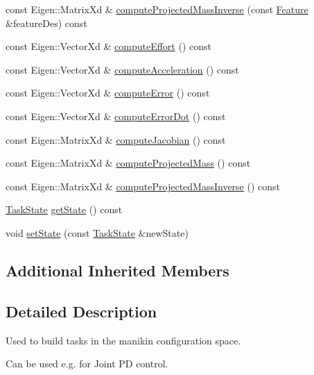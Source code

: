 \begin{DoxyCompactItemize}
\item 
const Eigen\+::\+Matrix\+Xd \& \hyperlink{classocra_1_1FullStateFeature_a53b841962a372665dbd0ec7a94c4cd74}{compute\+Projected\+Mass\+Inverse} (const \hyperlink{classocra_1_1Feature}{Feature} \&feature\+Des) const
\item 
const Eigen\+::\+Vector\+Xd \& \hyperlink{classocra_1_1FullStateFeature_a65b58a3fac72eab7f9bd18cb20775798}{compute\+Effort} () const
\item 
const Eigen\+::\+Vector\+Xd \& \hyperlink{classocra_1_1FullStateFeature_a7e668c7fa50e2ee6947c2f97dcd18e4e}{compute\+Acceleration} () const
\item 
const Eigen\+::\+Vector\+Xd \& \hyperlink{classocra_1_1FullStateFeature_a8a8e1a72f3aa7b417b5d347eaee69ebb}{compute\+Error} () const
\item 
const Eigen\+::\+Vector\+Xd \& \hyperlink{classocra_1_1FullStateFeature_af5d860acbb9dc600a432fcba952f95a7}{compute\+Error\+Dot} () const
\item 
const Eigen\+::\+Matrix\+Xd \& \hyperlink{classocra_1_1FullStateFeature_a9f1b50d69d0a5220286e9a7c3fb54835}{compute\+Jacobian} () const
\item 
const Eigen\+::\+Matrix\+Xd \& \hyperlink{classocra_1_1FullStateFeature_a5f2a243a7df81e7843bc258bef9cfae8}{compute\+Projected\+Mass} () const
\item 
const Eigen\+::\+Matrix\+Xd \& \hyperlink{classocra_1_1FullStateFeature_a1b3231544c745efacc3665f567bb4402}{compute\+Projected\+Mass\+Inverse} () const
\item 
\hyperlink{classocra_1_1TaskState}{Task\+State} \hyperlink{classocra_1_1FullStateFeature_aa0e23c8feabb2e6855404cd90032ffbc}{get\+State} () const
\item 
void \hyperlink{classocra_1_1FullStateFeature_a77263aff16d7078ac19dc2eb6a196a65}{set\+State} (const \hyperlink{classocra_1_1TaskState}{Task\+State} \&new\+State)
\end{DoxyCompactItemize}
\subsection*{Additional Inherited Members}


\subsection{Detailed Description}
Used to build tasks in the manikin configuration space. 

Can be used e.\+g. for Joint PD control. 

